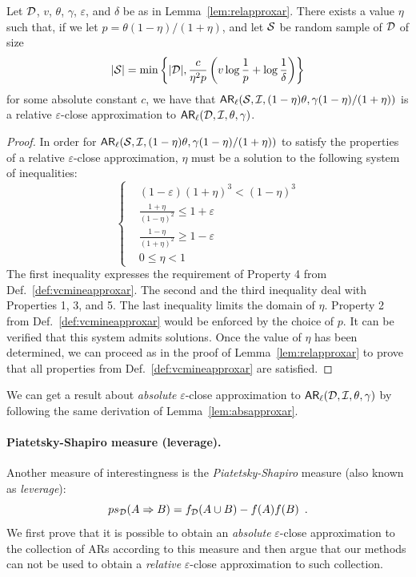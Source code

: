 \begin{lemma}\label{lem:liftrelapproxar}
  Let ${\cal D}$, $v$, $\theta$, $\gamma$, $\varepsilon$, and $\delta$ be as in
  Lemma~\ref{lem:relapproxar}. There exists a value $\eta$ such that, if we let
  $p=\theta(1-\eta)/(1+\eta)$, and let ${\cal S}$ be random sample of ${\cal D}$ of size
  \[
  |{\cal S}|=\min\left\{|{\cal D}|,\frac{c}{\eta^2p}\left(v\log\frac{1}{p}+\log\frac{1}{\delta}\right)\right\}
  \]
  for some absolute constant $c$, we have that
  $\mathsf{AR}_{\ell}({\cal S},{\cal I},(1-\eta)\theta,\gamma(1-\eta)/(1+\eta))$ is a relative
  $\varepsilon$-close approximation to $\mathsf{AR}_{\ell}({\cal D},{\cal I},\theta,\gamma)$.
\end{lemma}
\begin{proof}
 In order for
  $\mathsf{AR}_{\ell}({\cal S},{\cal I},(1-\eta)\theta,\gamma(1-\eta)/(1+\eta))$ to satisfy the
  properties of a relative $\varepsilon$-close approximation, $\eta$
  must be a solution to the following system of inequalities:
 \begin{equation*}
   \left\{
   \begin{aligned}
    &(1-\varepsilon)(1+\eta)^3<(1-\eta)^3\\
    &\frac{1+\eta}{(1-\eta)^2}\le 1+\varepsilon\\
    &\frac{1-\eta}{(1+\eta)^2}\ge 1-\varepsilon\\
    &0\le \eta<1
  \end{aligned}
  \right.
  \end{equation*}
    The first inequality expresses the requirement of Property 4 from
  Def.~\ref{def:vcmineapproxar}. The second and the third inequality deal with
  Properties 1, 3, and 5. The last inequality limits the domain of $\eta$.
  Property 2 from Def.~\ref{def:vcmineapproxar} would be enforced by the choice of
  $p$. It can be verified that this system admits solutions.
Once the value of $\eta$ has been determined, we can proceed as in the
  proof of Lemma~\ref{lem:relapproxar} to prove that all properties from
  Def.~\ref{def:vcmineapproxar} are satisfied.
\end{proof}

We can get a result about \emph{absolute} $\varepsilon$-close approximation to
$\mathsf{AR}_\ell({\cal D},{\cal I},\theta,\gamma)$ by following the same derivation of
Lemma~\ref{lem:absapproxar}.

\paragraph{Piatetsky-Shapiro measure (leverage).}
Another measure of interestingness is the
\emph{Piatetsky-Shapiro} measure (also known as \emph{leverage}):
\[
  ps_{\cal D}(A\Rightarrow B) = f_{\cal D}(A\cup B)-f(A)f(B)\enspace.
\]
We first prove that it is possible to obtain an \emph{absolute}
$\varepsilon$-close approximation to the collection of ARs according to this
measure and then argue that our methods can not be used to obtain a
\emph{relative} $\varepsilon$-close approximation to such collection.

